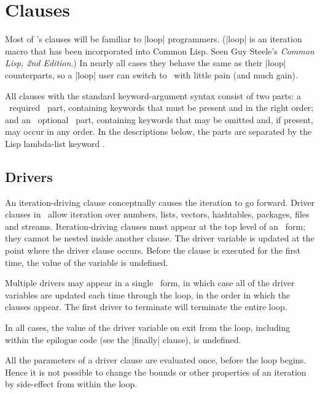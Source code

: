 \section{Clauses}

Most of \iter's clauses will be familiar to |loop| programmers.
(|loop| is an iteration macro that has been incorporated into Common
Lisp.  Seen Guy Steele's {\em Common Lisp, 2nd Edition}.)
In
nearly all cases they behave the same as their |loop| counterparts, so
a |loop| user can switch to \iter\ with little pain (and much gain).

All clauses with the standard keyword-argument syntax consist of two
parts: a ~required~ part,
containing keywords that must be present and in the right order; and
an ~optional~ part, containing keywords that may be omitted and,
if present, may occur in any order.  In the descriptions below, the
parts are separated by the Lisp lambda-list keyword \opt.


\subsection{Drivers}

An iteration-driving clause
conceptually causes the iteration to go forward.  Driver clauses in
\iter\ allow iteration over numbers, lists, vectors, hashtables, packages,
files and streams.  Iteration-driving clauses must
appear at the top level of an \iter\ form; they cannot be nested
inside another clause.  The driver variable is updated at the point
where the driver clause occurs.  Before the clause is executed for the
first time, the value of the variable is undefined.


Multiple drivers may appear in a single \iter\ form, in which case all
of the driver variables are updated each time through the loop, in the
order in which the clauses appear.  The first driver to terminate will
terminate the entire loop.

In all cases, the value of the driver variable on exit from the loop,
including within the epilogue code (see the |finally| clause), is
undefined.

All the parameters of a driver clause are evaluated once, before the
loop begins.  Hence it is not possible to change the bounds or other
properties of an iteration by side-effect from within the loop.

